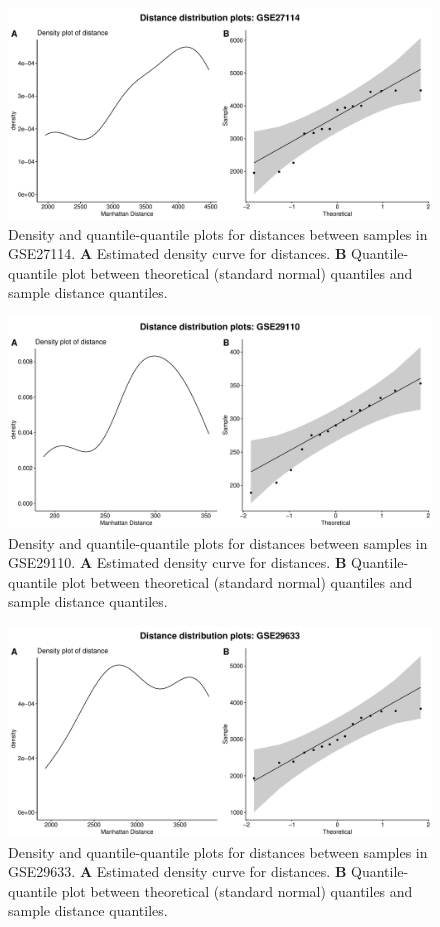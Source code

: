 \documentclass[10pt,letterpaper]{article}\usepackage[]{graphicx}\usepackage[]{color}
\begin{document}
\begin{figure}[H]
	\includegraphics[width=\textwidth]{manhattan-distance_hist_GSE27114.pdf}
	\caption{Density and quantile-quantile plots for distances between samples in GSE27114. \textbf{A} Estimated density curve for distances. \textbf{B} Quantile-quantile plot between theoretical (standard normal) quantiles and sample distance quantiles.}
\end{figure}

\begin{figure}[H]
	\includegraphics[width=\textwidth]{manhattan-distance_hist_GSE29110.pdf}
	\caption{Density and quantile-quantile plots for distances between samples in GSE29110. \textbf{A} Estimated density curve for distances. \textbf{B} Quantile-quantile plot between theoretical (standard normal) quantiles and sample distance quantiles.}
\end{figure}

\begin{figure}[H]
	\includegraphics[width=\textwidth]{manhattan-distance_hist_GSE29633.pdf}
	\caption{Density and quantile-quantile plots for distances between samples in GSE29633. \textbf{A} Estimated density curve for distances. \textbf{B} Quantile-quantile plot between theoretical (standard normal) quantiles and sample distance quantiles.}
\end{figure}
\end{document}
